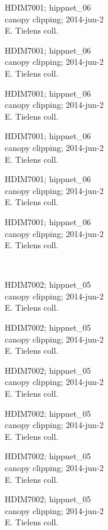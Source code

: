 \documentclass[2pt]{extarticle}
\begin{document}
\noindent
\parbox{0.16\textwidth}{\tiny \raggedright \rule[-0.3\baselineskip]{0pt}{10pt}HDIM7001; hippnet\_06\\ canopy clipping; 2014-jun-2\\ E. Tielens coll.}
\parbox{0.16\textwidth}{\tiny \raggedright \rule[-0.3\baselineskip]{0pt}{10pt}HDIM7001; hippnet\_06\\ canopy clipping; 2014-jun-2\\ E. Tielens coll.}
\parbox{0.16\textwidth}{\tiny \raggedright \rule[-0.3\baselineskip]{0pt}{10pt}HDIM7001; hippnet\_06\\ canopy clipping; 2014-jun-2\\ E. Tielens coll.}
\parbox{0.16\textwidth}{\tiny \raggedright \rule[-0.3\baselineskip]{0pt}{10pt}HDIM7001; hippnet\_06\\ canopy clipping; 2014-jun-2\\ E. Tielens coll.}
\parbox{0.16\textwidth}{\tiny \raggedright \rule[-0.3\baselineskip]{0pt}{10pt}HDIM7001; hippnet\_06\\ canopy clipping; 2014-jun-2\\ E. Tielens coll.}
\parbox{0.16\textwidth}{\tiny \raggedright \rule[-0.3\baselineskip]{0pt}{10pt}HDIM7001; hippnet\_06\\ canopy clipping; 2014-jun-2\\ E. Tielens coll.} \\ 
\vspace{0.001in} 

\noindent
\parbox{0.16\textwidth}{\tiny \raggedright \rule[-0.3\baselineskip]{0pt}{10pt}HDIM7002; hippnet\_05\\ canopy clipping; 2014-jun-2\\ E. Tielens coll.}
\parbox{0.16\textwidth}{\tiny \raggedright \rule[-0.3\baselineskip]{0pt}{10pt}HDIM7002; hippnet\_05\\ canopy clipping; 2014-jun-2\\ E. Tielens coll.}
\parbox{0.16\textwidth}{\tiny \raggedright \rule[-0.3\baselineskip]{0pt}{10pt}HDIM7002; hippnet\_05\\ canopy clipping; 2014-jun-2\\ E. Tielens coll.}
\parbox{0.16\textwidth}{\tiny \raggedright \rule[-0.3\baselineskip]{0pt}{10pt}HDIM7002; hippnet\_05\\ canopy clipping; 2014-jun-2\\ E. Tielens coll.}
\parbox{0.16\textwidth}{\tiny \raggedright \rule[-0.3\baselineskip]{0pt}{10pt}HDIM7002; hippnet\_05\\ canopy clipping; 2014-jun-2\\ E. Tielens coll.}
\parbox{0.16\textwidth}{\tiny \raggedright \rule[-0.3\baselineskip]{0pt}{10pt}HDIM7002; hippnet\_05\\ canopy clipping; 2014-jun-2\\ E. Tielens coll.} \\ 
\vspace{0.001in} 
\end{document}
